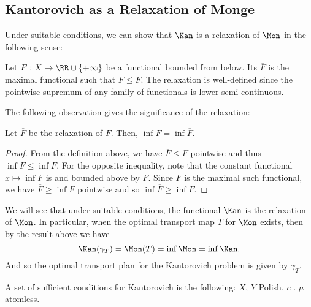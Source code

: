 \documentclass[oneside,reqno,letterpaper]{amsart}
\begin{document}
\subsection{Kantorovich as a Relaxation of Monge}
Under suitable conditions, we can show that \(\Kan\) is a relaxation of \(\Mon\) in the following sense:
\begin{definition}[Relaxation]
  Let \(F: X \to \RR \cup \left\{+\infty\right\}\) be a functional bounded from below.
  Its  \(\overline{F}\) is the maximal \lsc functional such that \(\overline{F} \leq F\).
  The relaxation is well-defined since the pointwise supremum of any family of \lsc functionals is lower semi-continuous.
\end{definition}

The following observation gives the significance of the relaxation:
\begin{proposition}
  Let \(\overline{F}\) be the relaxation of \(F\).
  Then, \(\inf F = \inf \overline{F}\).
\end{proposition}
\begin{proof}
  From the definition above, we have \(\overline{F} \leq F\) pointwise and thus \(\inf \overline{F} \leq \inf F\).
  For the opposite inequality, note that the constant functional \(x \mapsto \inf F\) is \lsc and bounded above by \(F\).
  Since \(\overline{F}\) is the maximal such functional, we have \(\overline{F} \geq \inf F\) pointwise and so \(\inf \overline{F} \geq \inf F\).
\end{proof}


We will see that under suitable conditions, the functional \(\Kan\) is the relaxation of \(\Mon\).
In particular, when the optimal transport map \(T\) for \(\Mon\) exists, then by the result above we have
\[
  \Kan(\gamma_T)
  = \Mon(T)
  = \inf \Mon
  = \inf \Kan.
\]
And so the optimal transport plan for the Kantorovich problem is given by \(\gamma_T\).



\begin{itodo}
A set of sufficient conditions for Kantorovich is the following:
\(X\), \(Y\) Polish.
\(c\) \lsc.
\(\mu\) atomless.
\end{itodo}
\end{document}
